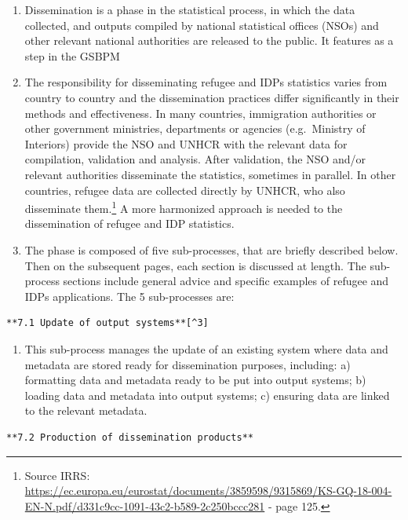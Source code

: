 \documentclass[
]{article}
\providecommand{\tightlist}{%
  \setlength{\itemsep}{0pt}\setlength{\parskip}{0pt}}
\begin{document}
\begin{enumerate}
\def\labelenumi{\arabic{enumi}.}
\setcounter{enumi}{485}
\item
  Dissemination is a phase in the statistical process, in which the
  data collected, and outputs compiled by national statistical offices
  (NSOs) and other relevant national authorities are released to the
  public. It features as a step in the GSBPM
\item
  The responsibility for disseminating refugee and IDPs statistics
  varies from country to country and the dissemination practices
  differ significantly in their methods and effectiveness. In many
  countries, immigration authorities or other government ministries,
  departments or agencies (e.g.~Ministry of Interiors) provide the NSO
  and UNHCR with the relevant data for compilation, validation and
  analysis. After validation, the NSO and/or relevant authorities
  disseminate the statistics, sometimes in parallel. In other
  countries, refugee data are collected directly by UNHCR, who also
  disseminate them.\footnote{Source IRRS:
    \url{https://ec.europa.eu/eurostat/documents/3859598/9315869/KS-GQ-18-004-EN-N.pdf/d331c9cc-1091-43c2-b589-2c250bccc281}
    - page 125.} A more harmonized approach is needed to the
  dissemination of refugee and IDP statistics.
\item
  The phase is composed of five sub-processes, that are briefly
  described below. Then on the subsequent pages, each section is
  discussed at length. The sub-process sections include general advice
  and specific examples of refugee and IDPs applications. The 5
  sub-processes are:
\end{enumerate}

\begin{verbatim}
**7.1 Update of output systems**[^3]
\end{verbatim}

\begin{enumerate}
\def\labelenumi{\arabic{enumi}.}
\setcounter{enumi}{488}
\tightlist
\item
  This sub-process manages the update of an existing system where
  data and metadata are stored ready for dissemination purposes,
  including: a) formatting data and metadata ready to be put into
  output systems; b) loading data and metadata into output systems; c)
  ensuring data are linked to the relevant metadata.
\end{enumerate}

\begin{verbatim}
**7.2 Production of dissemination products**
\end{verbatim}
\end{document}
